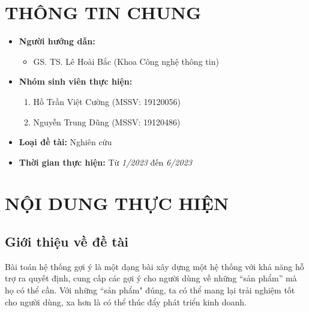 \documentclass{article}[14pt]
\begin{document}
    \vspace{.5cm}
    
    \Large
    \section{THÔNG TIN CHUNG}
    \begin{itemize}[label = {}]
        
        \item \textbf{Người hướng dẫn:} 
        \begin{itemize}
            \item GS. TS. Lê Hoài Bắc  (Khoa Công nghệ thông tin)
        \end{itemize}{}
    
        
        \item \textbf{Nhóm sinh viên thực hiện:}
        
        \begin{enumerate}
        
            \item Hồ Trần Việt Cường (MSSV: 19120056) 
            \item Nguyễn Trung Dũng (MSSV: 19120486)
        \end{enumerate}

        \item \textbf{Loại đề tài:} Nghiên cứu
        
        \item \textbf{Thời gian thực hiện:} Từ \textit{1/2023} đến \textit{6/2023}
        
        
    \end{itemize}
    
    \pagebreak 
    
    \section{NỘI DUNG THỰC HIỆN}

    
    \subsection{Giới thiệu về đề tài}
    
    Bài toán hệ thống gợi ý là một dạng bài xây dựng một hệ thống với khả năng hỗ trợ ra quyết định, cung cấp các gợi ý cho người dùng về những “sản phẩm” mà họ có thể cần. Với những “sản phẩm" đúng, ta có thể mang lại trải nghiệm tốt cho người dùng, xa hơn là có thể thúc đẩy phát triển kinh doanh.
\end{document}
